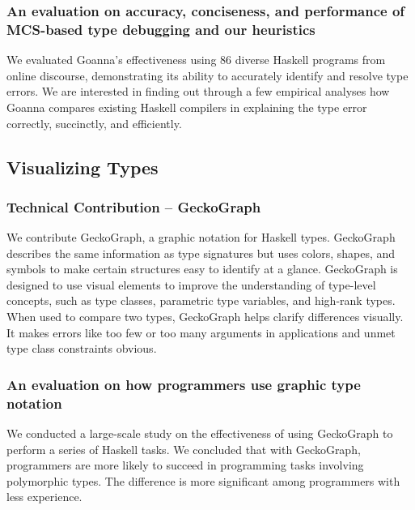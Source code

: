 \subsubsection{An evaluation on accuracy, conciseness, and performance of MCS-based type debugging and our heuristics}

We evaluated Goanna's effectiveness using 86 diverse Haskell programs from online discourse, demonstrating its ability to accurately identify and resolve type errors. We are interested in finding out through a few empirical analyses how Goanna compares existing Haskell compilers in explaining the type error correctly, succinctly, and efficiently.


\subsection{Visualizing Types}

\subsubsection{Technical Contribution -- GeckoGraph}

We contribute GeckoGraph, a graphic notation for Haskell types. GeckoGraph describes the same information as type signatures but uses colors, shapes, and symbols to make certain structures easy to identify at a glance. GeckoGraph is designed to use visual elements to improve the understanding of type-level concepts, such as type classes, parametric type variables, and high-rank types. When used to compare two types, GeckoGraph helps clarify differences visually. It makes errors like too few or too many arguments in applications and unmet type class constraints obvious.

\subsubsection{An evaluation on how programmers use graphic type notation}

We conducted a large-scale study on the effectiveness of using GeckoGraph to perform a series of Haskell tasks. We concluded that with GeckoGraph, programmers are more likely to succeed in programming tasks involving polymorphic types. The difference is more significant among programmers with less experience.


